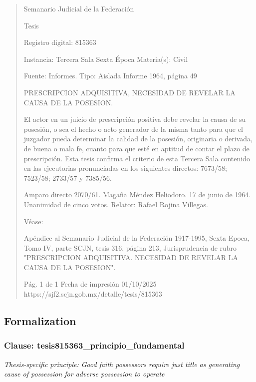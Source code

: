 \documentclass[11pt,a4paper]{article}
\begin{document}
\begin{quote}
                                                   Semanario Judicial de la Federación

                                                  Tesis

 Registro digital: 815363

 Instancia: Tercera Sala          Sexta Época                          Materia(s): Civil

                                  Fuente: Informes.                    Tipo: Aislada
                                  Informe 1964, página 49


PRESCRIPCION ADQUISITIVA, NECESIDAD DE REVELAR LA CAUSA DE LA POSESION.


El actor en un juicio de prescripción positiva debe revelar la causa de su posesión, o sea el hecho o
acto generador de la misma tanto para que el juzgador pueda determinar la calidad de la posesión,
originaria o derivada, de buena o mala fe, cuanto para que esté en aptitud de contar el plazo de
prescripción. Esta tesis confirma el criterio de esta Tercera Sala contenido en las ejecutorias
pronunciadas en los siguientes directos: 7673/58; 7523/58; 2733/57 y 7385/56.



Amparo directo 2070/61. Magaña Méndez Heliodoro. 17 de junio de 1964. Unanimidad de cinco
votos. Relator: Rafael Rojina Villegas.

Véase:

Apéndice al Semanario Judicial de la Federación 1917-1995, Sexta Epoca, Tomo IV, parte SCJN,
tesis 316, página 213, Jurisprudencia de rubro "PRESCRIPCION ADQUISITIVA. NECESIDAD DE
REVELAR LA CAUSA DE LA POSESION".




                                             Pág. 1 de 1            Fecha de impresión 01/10/2025
  https://sjf2.scjn.gob.mx/detalle/tesis/815363

\end{quote}

\subsection{Formalization}

\subsubsection{Clause: tesis815363\_principio\_fundamental}

\textit{Thesis-specific principle: Good faith possessors require just title as generating cause of possession for adverse possession to operate}
\end{document}
